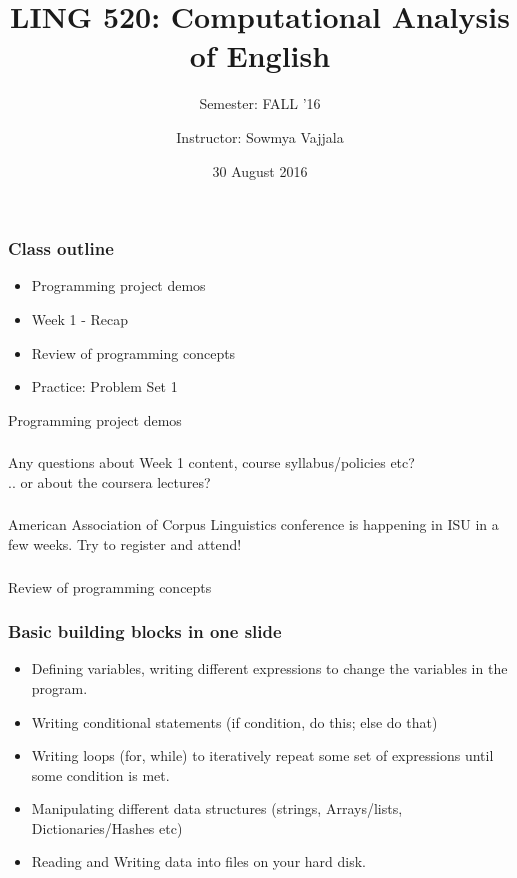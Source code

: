 \documentclass{beamer}
\author[Sowmya Vajjala]{Instructor: Sowmya Vajjala}
\title[LING 520]{LING 520: Computational Analysis of English}
\subtitle{Semester: FALL '16}
\date{30 August 2016}
\institute{Iowa State University, USA}
\begin{document}
\begin{frame}\titlepage
\end{frame}

\begin{frame}
\frametitle{Class outline}
\begin{itemize}
\item Programming project demos %
\item Week 1 - Recap %
\item Review of programming concepts %
\item Practice: Problem Set 1 %
\end{itemize}
\end{frame}

\begin{frame}
\begin{center}
\Large Programming project demos
\end{center}
\end{frame}

\begin{frame}
\frametitle{}
Any questions about Week 1 content, course syllabus/policies etc? \\ 
.. or about the coursera lectures? 
\end{frame}

\begin{frame}
\frametitle{}
American Association of Corpus Linguistics conference is happening in ISU in a few weeks. Try to register and attend! 
\end{frame}

\begin{frame}
\frametitle{}
\begin{center}
\Large Review of programming concepts
\end{center}
\end{frame}

\begin{frame}
\frametitle{Basic building blocks in one slide}
\begin{itemize}
\item Defining variables, writing different expressions to change the variables in the program.
\pause \item Writing conditional statements (if condition, do this; else do that) \pause
\item Writing loops (for, while) to iteratively repeat some set of expressions until some condition is met.
\pause \item Manipulating different data structures (strings, Arrays/lists, Dictionaries/Hashes etc)
\pause \item Reading and Writing data into files on your hard disk.
\end{itemize}
\end{frame}
\end{document}
